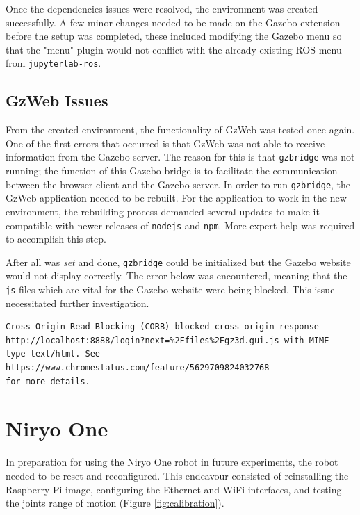     Once the dependencies issues were resolved, the environment was created successfully. A few minor changes needed to be made on the Gazebo extension before the setup was completed, these included modifying the Gazebo menu so that the "menu" plugin would not conflict with the already existing ROS menu from \texttt{jupyterlab-ros}.
    
    \subsection{GzWeb Issues}
    
    From the created environment, the functionality of GzWeb was tested once again. One of the first errors that occurred is that GzWeb was not able to receive information from the Gazebo server. The reason for this is that \texttt{gzbridge} was not running; the function of this Gazebo bridge is to facilitate the communication between the browser client and the Gazebo server. In order to run \texttt{gzbridge}, the GzWeb application needed to be rebuilt. For the application to work in the new environment, the rebuilding process demanded several updates to make it compatible with newer releases of \texttt{nodejs} and \texttt{npm}. More expert help was required to accomplish this step.
    
    After all was \textit{set} and done, \texttt{gzbridge} could be initialized but the Gazebo website would not display correctly. The error below was encountered, meaning that the \texttt{js} files which are vital for the Gazebo website were being blocked. This issue necessitated further investigation.
    
    \pagebreak
    \begin{lstlisting}[language=warning]
Cross-Origin Read Blocking (CORB) blocked cross-origin response
http://localhost:8888/login?next=%2Ffiles%2Fgz3d.gui.js with MIME 
type text/html. See https://www.chromestatus.com/feature/5629709824032768 
for more details.
    \end{lstlisting}
    

\section{Niryo One}

    In preparation for using the Niryo One robot in future experiments, the robot needed to be reset and reconfigured. This endeavour consisted of reinstalling the Raspberry Pi image, configuring the Ethernet and WiFi interfaces, and testing the joints range of motion (Figure \ref{fig:calibration}). 

